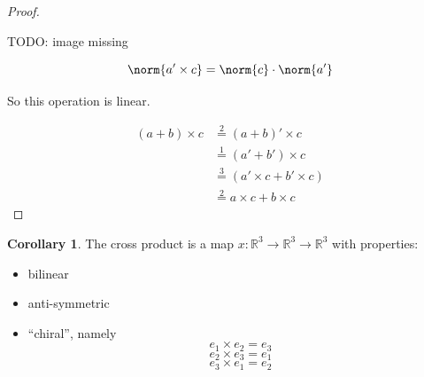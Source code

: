 \documentclass[a4paper,landscape,twocolumn]{article}
\theoremstyle{definition}
\newtheorem{cor}{Corollary}
\DeclarePairedDelimiter\norm\lVert\rVert
\begin{document}
\begin{proof}
\begin{enumerate}
      TODO: image missing

      \[ \norm{a' \times c} = \norm{c} \cdot \norm{a'} \]
  \end{enumerate}
  So this operation is linear.

  \begin{align*}
    (a + b) \times c
      &\stackrel{2}{=} (a + b)' \times c \\
      &\stackrel{1}{=} (a' + b') \times c \\
      &\stackrel{3}{=} (a' \times c + b' \times c) \\
      &\stackrel{2}{=} a \times c + b \times c
  \end{align*}
\end{proof}

\begin{cor}
  \label{cor-8.9}
  The cross product is a map $x: \mathbb R^3 \to \mathbb R^3 \to \mathbb R^3$
  with properties:
  \begin{itemize}
    \item bilinear
    \item anti-symmetric
    \item \enquote{chiral}, namely
      \[ e_1 \times e_2 = e_3 \]
      \[ e_2 \times e_3 = e_1 \]
      \[ e_3 \times e_1 = e_2 \]
  \end{itemize}
\end{cor}
\end{document}
